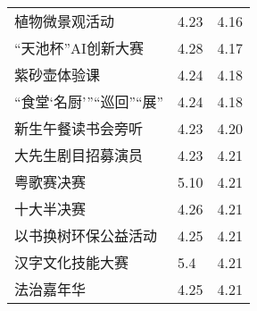 \documentclass[letterpaper, 12pt]{article}
\begin{document}
\begin{multicols}{2}
{\begin{longtable}{|>{\centering\arraybackslash}m{}|m{}|m{}|}
    植物微景观活动 & 4.23 & 4.16\\
    “天池杯”AI创新大赛 & 4.28 & 4.17\\
    紫砂壶体验课 & 4.24 & 4.18\\
    “食堂‘名厨’”“巡回”“展” & 4.24 & 4.18\\
    新生午餐读书会旁听 & 4.23 & 4.20\\
    大先生剧目招募演员 & 4.23 & 4.21\\
    粤歌赛决赛 & 5.10 & 4.21\\
    十大半决赛 & 4.26 & 4.21\\
    以书换树环保公益活动 & 4.25 & 4.21\\
    汉字文化技能大赛 & 5.4 & 4.21\\ 
    法治嘉年华 & 4.25 & 4.21\\
    \hline
\end{longtable}
\unskip
\unpenalty
\unpenalty}\unvbox\colbbox
\end{multicols}
\end{document}
